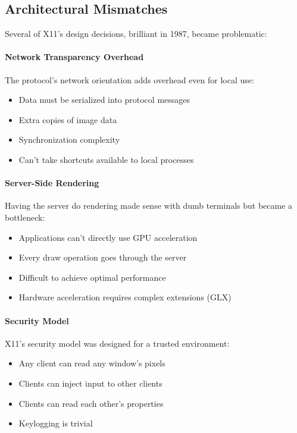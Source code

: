 \subsection{Architectural Mismatches}

Several of X11's design decisions, brilliant in 1987, became problematic:

\paragraph{Network Transparency Overhead}

The protocol's network orientation adds overhead even for local use:
\begin{itemize}[leftmargin=*]
    \item Data must be serialized into protocol messages
    \item Extra copies of image data
    \item Synchronization complexity
    \item Can't take shortcuts available to local processes
\end{itemize}

\paragraph{Server-Side Rendering}

Having the server do rendering made sense with dumb terminals but became a bottleneck:
\begin{itemize}[leftmargin=*]
    \item Applications can't directly use GPU acceleration
    \item Every draw operation goes through the server
    \item Difficult to achieve optimal performance
    \item Hardware acceleration requires complex extensions (GLX)
\end{itemize}

\paragraph{Security Model}

X11's security model was designed for a trusted environment:
\begin{itemize}[leftmargin=*]
    \item Any client can read any window's pixels
    \item Clients can inject input to other clients
    \item Clients can read each other's properties
    \item Keylogging is trivial
\end{itemize}

